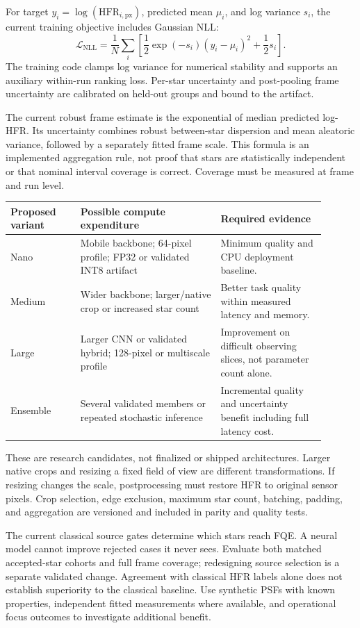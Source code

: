 \documentclass[11pt,a4paper]{article}
\begin{document}
For target $y_i=\log(\mathrm{HFR}_{i,\mathrm{px}})$, predicted mean $\mu_i$,
and log variance $s_i$, the current training objective includes Gaussian NLL:
\[
\mathcal L_{\mathrm{NLL}}=\frac{1}{N}\sum_i
\left[\frac{1}{2}\exp(-s_i)(y_i-\mu_i)^2+\frac{1}{2}s_i\right].
\]
The training code clamps log variance for numerical stability and supports an
auxiliary within-run ranking loss. Per-star uncertainty and post-pooling frame
uncertainty are calibrated on held-out groups and bound to the artifact.

The current robust frame estimate is the exponential of median predicted
log-HFR. Its uncertainty combines robust between-star dispersion and mean
aleatoric variance, followed by a separately fitted frame scale. This formula
is an implemented aggregation rule, not proof that stars are statistically
independent or that nominal interval coverage is correct. Coverage must be
measured at frame and run level.

\begin{longtable}{@{}L{0.20\linewidth}L{0.40\linewidth}L{0.30\linewidth}@{}}
\toprule Proposed variant & Possible compute expenditure & Required evidence\\\midrule\endhead
Nano & Mobile backbone; 64-pixel profile; FP32 or validated INT8 artifact &
Minimum quality and CPU deployment baseline.\\
Medium & Wider backbone; larger/native crop or increased star count &
Better task quality within measured latency and memory.\\
Large & Larger CNN or validated hybrid; 128-pixel or multiscale profile &
Improvement on difficult observing slices, not parameter count alone.\\
Ensemble & Several validated members or repeated stochastic inference &
Incremental quality and uncertainty benefit including full latency cost.\\
\bottomrule
\end{longtable}
These are research candidates, not finalized or shipped architectures. Larger
native crops and resizing a fixed field of view are different transformations.
If resizing changes the scale, postprocessing must restore HFR to original
sensor pixels. Crop selection, edge exclusion, maximum star count, batching,
padding, and aggregation are versioned and included in parity and quality tests.

The current classical source gates determine which stars reach FQE. A neural
model cannot improve rejected cases it never sees. Evaluate both matched
accepted-star cohorts and full frame coverage; redesigning source selection is
a separate validated change. Agreement with classical HFR labels alone does
not establish superiority to the classical baseline. Use synthetic PSFs with
known properties, independent fitted measurements where available, and
operational focus outcomes to investigate additional benefit.
\end{document}
